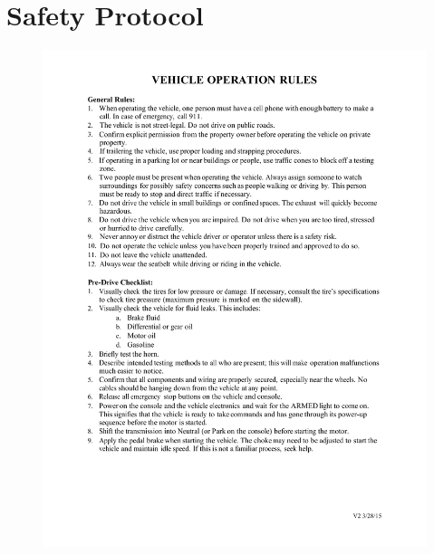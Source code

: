 \chapter{Safety Protocol} \label{app:safety}

\begin{figure}[H]
	\centerline{\includegraphics[width=1.0\linewidth]{OperatingSafetyRules_v2.pdf}}
\end{figure}

